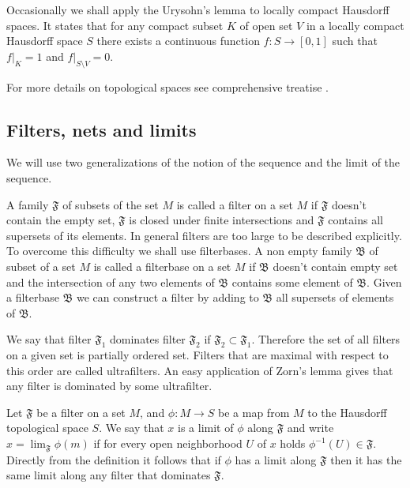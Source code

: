 Occasionally we shall apply the Urysohn's lemma to locally compact Hausdorff spaces. It states that for any compact subset $K$ of open set $V$ in a locally compact Hausdorff space $S$ there exists a continuous function $f:S\to [0,1]$ such that $f|_K=1$ and $f|_{S\setminus V}=0$. 

For more details on topological spaces see comprehensive treatise \cite{EngelGenTop}. 


\subsection{Filters, nets and limits}

\label{SubSectionFiltersNetsAndLimits} 

We will use two generalizations of the notion of the sequence and the limit of the sequence.

A family $\mathfrak{F}$ of subsets of the set $M$ is called a filter on a set $M$ if $\mathfrak{F}$ doesn't contain the empty set, $\mathfrak{F}$ is closed under finite intersections and $\mathfrak{F}$ contains all supersets of its elements. In general filters are too large to be described explicitly. To overcome this difficulty we shall use filterbases. A non empty family $\mathfrak{B}$ of subset of a set $M$ is called a filterbase on a set $M$ if $\mathfrak{B}$ doesn't contain empty set and the intersection of any two elements of $\mathfrak{B}$ contains some element of $\mathfrak{B}$. Given a filterbase $\mathfrak{B}$ we can construct a filter by adding to $\mathfrak{B}$ all supersets of elements of $\mathfrak{B}$.

We say that filter $\mathfrak{F}_1$ dominates filter $\mathfrak{F}_2$ if $\mathfrak{F}_2\subset\mathfrak{F}_1$. Therefore the set of all filters on a given set is partially ordered set. Filters that are maximal with respect to this order are called ultrafilters. An easy application of Zorn's lemma gives that any filter is dominated by some ultrafilter.

Let $\mathfrak{F}$ be a filter on  a set $M$, and $\phi:M\to S$ be a map from $M$ to the Hausdorff topological space $S$. We say that $x$ is a limit of $\phi$ along $\mathfrak{F}$ and write $x=\lim_{\mathfrak{F}} \phi(m)$ if for every open neighborhood $U$ of $x$ holds $\phi^{-1}(U)\in\mathfrak{F}$. Directly from the definition it follows that if $\phi$ has a limit along $\mathfrak{F}$ then it has the same limit along any filter that dominates $\mathfrak{F}$. 

